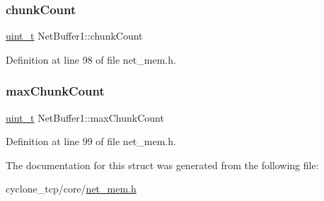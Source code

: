 \mbox{\label{structNetBuffer1_a05cff68539009da3dd878a7b7d38e1e6}} 
\subsubsection{\texorpdfstring{chunk\+Count}{chunkCount}}
{\footnotesize\ttfamily \hyperlink{compiler__port_8h_a12a1e9b3ce141648783a82445d02b58d}{uint\+\_\+t} Net\+Buffer1\+::chunk\+Count}



Definition at line 98 of file net\+\_\+mem.\+h.

\mbox{\label{structNetBuffer1_a17baf9f6d2d0ea0520a6ee1b00e954de}} 
\subsubsection{\texorpdfstring{max\+Chunk\+Count}{maxChunkCount}}
{\footnotesize\ttfamily \hyperlink{compiler__port_8h_a12a1e9b3ce141648783a82445d02b58d}{uint\+\_\+t} Net\+Buffer1\+::max\+Chunk\+Count}



Definition at line 99 of file net\+\_\+mem.\+h.



The documentation for this struct was generated from the following file\+:\begin{DoxyCompactItemize}
\item 
cyclone\+\_\+tcp/core/\hyperlink{net__mem_8h}{net\+\_\+mem.\+h}\end{DoxyCompactItemize}
